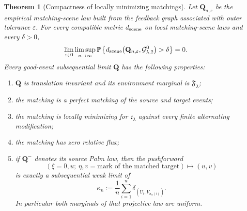 \documentclass[11pt,reqno]{amsart}
\newtheorem{theorem}{Theorem}[section]
\theoremstyle{definition}
\theoremstyle{remark}
\numberwithin{equation}{section}
\newcommand{\Pp}{\mathbb P}
\newcommand{\cF}{\mathfrak F}
\begin{document}
\begin{theorem}[Compactness of locally minimizing matchings]
\label{thm:comp}
Let \(\mathbf Q_{n,\varepsilon}\) be the empirical matching-scene law
built from the feedback graph associated with outer tolerance
\(\varepsilon\).  For every compatible metric \(d_{\rm scene}\) on local
matching-scene laws and every \(\delta>0\),
\begin{equation}
\lim_{\varepsilon\downarrow0}
\limsup_{n\to\infty}
\Pp\left\{
d_{\rm scene}\bigl(
\mathbf Q_{n,\varepsilon},\mathcal G_{\lambda,2}^0
\bigr)>\delta
\right\}=0.
\label{eq:4.C}
\end{equation}
Every good-event subsequential limit \(\mathbf Q\) has the following
properties:

\begin{enumerate}[label=\textup{(\roman*)},leftmargin=2.3em]
\item \(\mathbf Q\) is translation invariant and its environment
marginal is \(\cF_\lambda\);

\item the matching is a perfect matching of the source and target events;

\item the matching is locally minimizing for
\(\mathfrak c_\lambda\) against every finite alternating modification;

\item the matching has zero relative flux;

\item if \(\mathbf Q^{-}\) denotes its source Palm law, then the
pushforward
\[
(\xi=0,u;\ \eta,v=\text{mark of the matched target})
\longmapsto (u,v)
\]
is exactly a subsequential weak limit of
\begin{equation}
\kappa_n:=\frac1n\sum_{i=1}^n
\delta_{(U_i,V_{\sigma_n(i)})}.
\label{eq:4.22}
\end{equation}
In particular both marginals of that projective law are uniform.
\end{enumerate}
\end{theorem}
\end{document}
